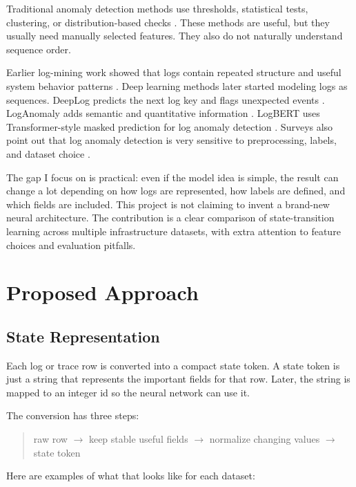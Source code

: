 \documentclass[11pt]{article}
\begin{document}
Traditional anomaly detection methods use thresholds, statistical tests, clustering, or distribution-based checks \cite{chandola2009survey}. These methods are useful, but they usually need manually selected features. They also do not naturally understand sequence order.

Earlier log-mining work showed that logs contain repeated structure and useful system behavior patterns \cite{xu2009consolelogs,lou2010invariants}. Deep learning methods later started modeling logs as sequences. DeepLog predicts the next log key and flags unexpected events \cite{du2017deeplog}. LogAnomaly adds semantic and quantitative information \cite{meng2019loganomaly}. LogBERT uses Transformer-style masked prediction for log anomaly detection \cite{guo2021logbert}. Surveys also point out that log anomaly detection is very sensitive to preprocessing, labels, and dataset choice \cite{landauer2023dlsurvey}.

The gap I focus on is practical: even if the model idea is simple, the result can change a lot depending on how logs are represented, how labels are defined, and which fields are included. This project is not claiming to invent a brand-new neural architecture. The contribution is a clear comparison of state-transition learning across multiple infrastructure datasets, with extra attention to feature choices and evaluation pitfalls.

\section{Proposed Approach}

\subsection{State Representation}

Each log or trace row is converted into a compact state token. A state token is just a string that represents the important fields for that row. Later, the string is mapped to an integer id so the neural network can use it.

The conversion has three steps:

\begin{quote}
raw row $\rightarrow$ keep stable useful fields $\rightarrow$ normalize changing values $\rightarrow$ state token
\end{quote}

Here are examples of what that looks like for each dataset:
\end{document}
